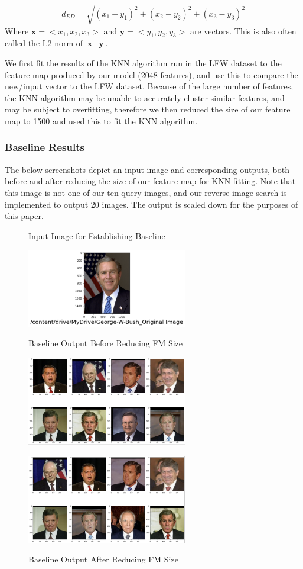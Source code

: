 \documentclass[conference]{IEEEtran}
\begin{document}
\begin{equation}
d_{ED}= \sqrt{ (x_1-y_1)^2 + (x_2-y_2)^2 + (x_3-y_3)^2 } \label{eq:1}
\end{equation}
Where $\textbf{x}=<x_1,x_2,x_3>$ and $\textbf{y}=<y_1,y_2,y_3>$ are vectors. This is also often called the L2 norm of $\textbf{x}-\textbf{y}$.

We first fit the results of the KNN algorithm run in the LFW dataset to the feature map produced by our model (2048 features), and use this to compare the new/input vector to the LFW dataset. Because of the large number of features, the KNN algorithm may be unable to accurately cluster similar features, and may be subject to overfitting, therefore we then reduced the size of our feature map to 1500 and used this to fit the KNN algorithm. 

\subsubsection{Baseline Results}
The below screenshots depict an input image and corresponding outputs, both before and after reducing the size of our feature map for KNN fitting. Note that this image is not one of our ten query images, and our reverse-image search is implemented to output 20 images. The output is scaled down for the purposes of this paper.

\begin{figure}[h]
    \centering
    \caption{Input Image for Establishing Baseline}
    \includegraphics[width=7cm]{gwbush.png}
    \label{fig:2}

    \caption{Baseline Output Before Reducing FM Size}
    \includegraphics[width=7cm]{og_baseline.png}
    \label{fig:3}
    
    \caption{Baseline Output After Reducing FM Size}
    \includegraphics[width=7cm]{pca_baseline.png}
    \label{fig:4}
    \centering
\end{figure}
\end{document}
